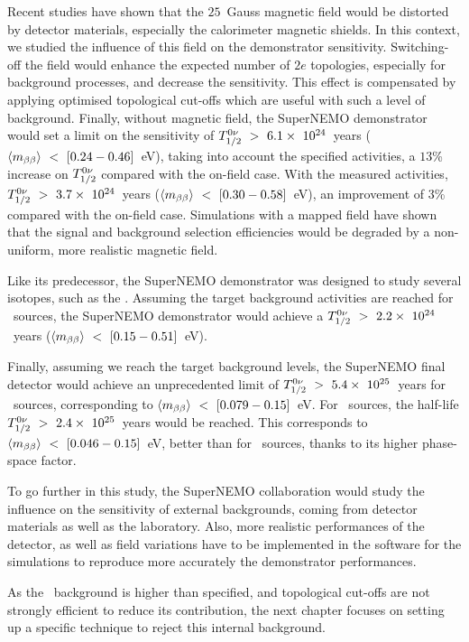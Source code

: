 Recent studies have shown that the $25$~Gauss magnetic field would be distorted by detector materials, especially the calorimeter magnetic shields.
In this context, we studied the influence of this field on the demonstrator sensitivity.
Switching-off the field would enhance the expected number of $2e$ topologies, especially for background processes, and decrease the sensitivity.
This effect is compensated by applying optimised topological cut-offs which are useful with such a level of background.
Finally, without magnetic field, the SuperNEMO demonstrator would set a limit on the sensitivity of $T_{1/2}^{0\nu}~>~6.1\times~10^{24}$~years ($\langle m_{\beta\beta}\rangle~<~[0.24-0.46]$~eV), taking into account the specified activities, a $13$\% increase on $T_{1/2}^{0\nu}$ compared with the on-field case.
With the measured activities, $T_{1/2}^{0\nu}~>~3.7\times~10^{24}$~years ($\langle m_{\beta\beta}\rangle~<~[0.30-0.58]$~eV), an improvement of $3$\% compared with the on-field case.
Simulations with a mapped field have shown that the signal and background selection efficiencies would be degraded by a non-uniform, more realistic magnetic field.

Like its predecessor, the SuperNEMO demonstrator was designed to study several isotopes, such as the \Nd.
Assuming the target background activities are reached for \Nd\ sources, the SuperNEMO demonstrator would achieve a $T_{1/2}^{0\nu}~>~2.2\times~10^{24}$~years ($\langle m_{\beta\beta}\rangle~<~[0.15-0.51]$~eV).

Finally, assuming we reach the target background levels, the SuperNEMO final detector would achieve an unprecedented limit of $T_{1/2}^{0\nu}~>~5.4\times~10^{25}$~years for \Se\ sources, corresponding to $\langle m_{\beta\beta}\rangle~<~[0.079-0.15]$~eV.
For \Nd\ sources, the half-life $T_{1/2}^{0\nu}~>~2.4\times~10^{25}$~years would be reached.
This corresponds to $\langle m_{\beta\beta}\rangle~<~[0.046-0.15]$~eV, better than for \Se\ sources, thanks to its higher phase-space factor.

To go further in this study, the SuperNEMO collaboration would study the influence on the sensitivity of external backgrounds, coming from detector materials as well as the laboratory.
Also, more realistic performances of the detector, as well as field variations have to be implemented in the software for the simulations to reproduce more accurately the demonstrator performances.

As the \Tl\ background is higher than specified, and topological cut-offs are not strongly efficient to reduce its contribution, the next chapter focuses on setting up a specific technique to reject this internal background.

